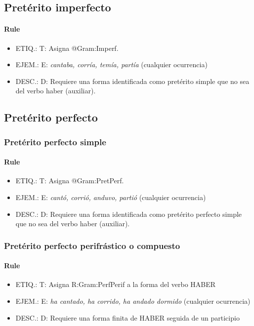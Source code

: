 \documentclass[11pt]{report}
\begin{document}
\subsection{Pretérito imperfecto}
\paragraph*{Rule}
\begin{itemize}
\item ETIQ.:  T: Asigna @Gram:Imperf.
\item EJEM.:  E: \emph{cantaba, corría, temía, partía} (cualquier ocurrencia)
\item DESC.:  D: Requiere una forma identificada como pretérito simple que no sea del verbo haber (auxiliar).
\end{itemize}

\subsection{Pretérito perfecto}
\subsubsection{Pretérito perfecto simple}
\paragraph*{Rule}
\begin{itemize}
\item ETIQ.:  T: Asigna @Gram:PretPerf.
\item EJEM.:  E: \emph{cantó, corrió, anduvo, partió} (cualquier ocurrencia)
\item DESC.:  D: Requiere una forma identificada como pretérito perfecto simple que no sea del verbo haber (auxiliar).
\end{itemize}

\subsubsection{Pretérito perfecto perifrástico o compuesto}
\paragraph*{Rule}
\begin{itemize}
\item ETIQ.:  T: Asigna R:Gram:PerfPerif a la forma del verbo HABER
\item EJEM.:  E: \emph{ha cantado, ha corrido, ha andado dormido} (cualquier ocurrencia)
\item DESC.:  D: Requiere una forma finita de HABER seguida de un participio
\end{itemize}
\end{document}
